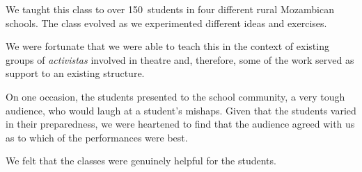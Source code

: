 \documentclass[article,twocolumn,twoside]{memoir}
\begin{document}
We taught this class to over 150~students in four different rural Mozambican
schools. The class evolved as we experimented different ideas and exercises.

We were fortunate that we were able to teach this in the context of existing
groups of \textit{activistas} involved in theatre and, therefore, some of the
work served as support to an existing structure.

On one occasion, the students presented to the school community, a very tough
audience, who would laugh at a student's mishaps. Given that the students
varied in their preparedness, we were heartened to find that the audience
agreed with us as to which of the performances were best.

We felt that the classes were genuinely helpful for the students.
\end{document}
